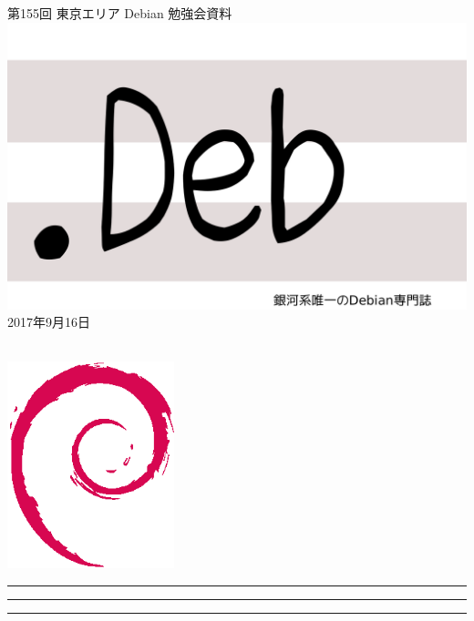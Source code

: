 \documentclass[mingoth,a4paper]{jsarticle}
\newcommand{\debmtgyear}{2017}
\newcommand{\debmtgmonth}{9}
\newcommand{\debmtgdate}{16}
\newcommand{\debmtgnumber}{155}
\begin{document}
\begin{titlepage}
\thispagestyle{empty}

\vspace*{-2cm}
第\debmtgnumber{}回 東京エリア Debian 勉強会資料\\
\hspace*{-2cm}
\includegraphics{image2012-natsu/dotdeb.pdf}\\
\hfill{}\debmtgyear{}年\debmtgmonth{}月\debmtgdate{}日

\\

\vspace*{-2cm}
\hfill{}\includegraphics[height=6cm]{image200502/openlogo-nd.eps}
\end{titlepage}

\newpage

\begin{minipage}[b]{0.2\hsize}
 \colorbox{titleback}{}
\end{minipage}
\begin{minipage}[b]{0.8\hsize}
\hrule
\vspace{2mm}
\hrule
\begin{multicols}{2}
\tableofcontents
\end{multicols}
\vspace{2mm}
\hrule
\end{minipage}
\end{document}
